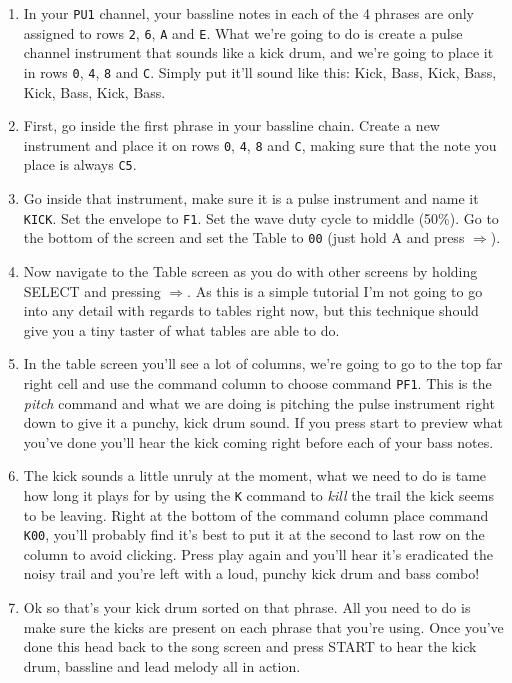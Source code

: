 \documentclass[]{article}
\newcommand{\buttonStyle}[1]{\textsf{#1}\xspace}
\newcommand{\buttonSymbolStyle}[1]{$\bm{#1}$\xspace}
\newcommand{\bA}{\buttonStyle{A}}
\newcommand{\bStart}{\buttonStyle{{START}}}
\newcommand{\bSelect}{\buttonStyle{{SELECT}}}
\newcommand{\bRight}{\buttonSymbolStyle{\Rightarrow}}
\newcommand{\nb}[1]{\texttt{#1}\xspace}
\begin{document}
\begin{enumerate}

\item  In your \nb{PU1} channel, your bassline notes in each of the 4 phrases are only assigned to rows \nb{2}, \nb{6}, \nb{A} and \nb{E}. What we're going to do is create a pulse channel instrument that sounds like a kick drum, and we're going to place it in rows \nb{0}, \nb{4}, \nb{8} and \nb{C}. Simply put it'll sound like this: Kick, Bass, Kick, Bass, Kick, Bass, Kick, Bass.

\item First, go inside the first phrase in your bassline chain. Create a new instrument and place it on rows \nb{0}, \nb{4}, \nb{8} and \nb{C}, making sure that the note you place is always \nb{C5}.

\item Go inside that instrument, make sure it is a pulse instrument and name it \nb{KICK}. Set the envelope to \nb{F1}. Set the wave duty cycle to middle (50\%). Go to the bottom of the screen and set the Table to \nb{00} (just hold \bA and press \bRight).

\item Now navigate to the Table screen as you do with other screens by holding \bSelect and pressing \bRight. As this is a simple tutorial I'm not going to go into any detail with regards to tables right now, but this technique should give you a tiny taster of what tables are able to do.

\item In the table screen you'll see a lot of columns, we're going to go to the top far right cell and use the command column to choose command \nb{PF1}. This is the \textit{pitch} command and what we are doing is pitching the pulse instrument right down to give it a punchy, kick drum sound. If you press start to preview what you've done you'll hear the kick coming right before each of your bass notes.

\item The kick sounds a little unruly at the moment, what we need to do is tame how long it plays for by using the \nb{K} command to \textit{kill} the trail the kick seems to be leaving. Right at the bottom of the command column place command \nb{K00}, you'll probably find it's best to put it at the second to last row on the column to avoid clicking. Press play again and you'll hear it's eradicated the noisy trail and you're left with a loud, punchy kick drum and bass combo!

\item Ok so that's your kick drum sorted on that phrase. All you need to do is make sure the kicks are present on each phrase that you're using. Once you've done this head back to the song screen and press \bStart to hear the kick drum, bassline and lead melody all in action.

\end{enumerate}
\end{document}
